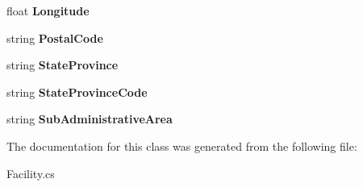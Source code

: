 \begin{DoxyCompactItemize}
float {\bfseries Longitude}
\item 
\mbox{\label{class_golf_now_a_p_i_1_1_address_a07b426913b35dd4753fa7f4bc6469196}} 
string {\bfseries Postal\+Code}
\item 
\mbox{\label{class_golf_now_a_p_i_1_1_address_a653649f487a04b6a2b312ad9ac065df1}} 
string {\bfseries State\+Province}
\item 
\mbox{\label{class_golf_now_a_p_i_1_1_address_ace4b236130c6b2c99cb89852d8587677}} 
string {\bfseries State\+Province\+Code}
\item 
\mbox{\label{class_golf_now_a_p_i_1_1_address_ad8fbe11677bf5b121dc0e50f12c0e48f}} 
string {\bfseries Sub\+Administrative\+Area}
\end{DoxyCompactItemize}


The documentation for this class was generated from the following file\+:\begin{DoxyCompactItemize}
\item 
Facility.\+cs\end{DoxyCompactItemize}
